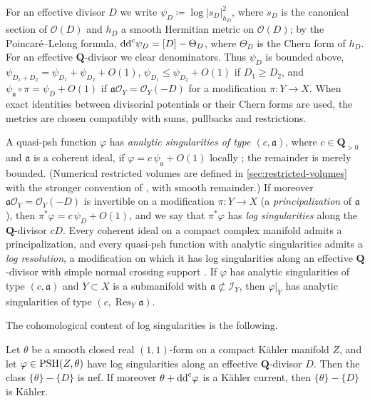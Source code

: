 \documentclass[11pt,a4paper]{amsart}
\newcommand{\rest}[1]{\operatorname{Res}_{#1}}   %
\theoremstyle{definition}
\begin{document}
For an effective divisor $D$ we write
$\psi_D\coloneqq \log|s_D|_{h_D}^2$, where $s_D$ is the canonical section of
$\mathcal O(D)$ and $h_D$ a smooth Hermitian metric on $\mathcal O(D)$;
by the Poincar\'e--Lelong formula, $\mathrm{dd}^{\mathrm{c}}\psi_D=[D]-\Theta_D$, where
$\Theta_D$ is the Chern form of $h_D$. For an effective
$\mathbf Q$-divisor we clear denominators. Thus $\psi_D$ is bounded above,
$\psi_{D_1+D_2}=\psi_{D_1}+\psi_{D_2}+O(1)$,
$\psi_{D_1}\le\psi_{D_2}+O(1)$ if $D_1\ge D_2$, and
$\psi_{\mathfrak a}\circ\pi=\psi_D+O(1)$ if
$\mathfrak a\mathcal O_Y=\mathcal O_Y(-D)$ for a modification
$\pi\colon Y\to X$. When exact identities between divisorial potentials or
their Chern forms are used, the metrics are chosen compatibly with sums,
pullbacks and restrictions.

A quasi-psh function $\varphi$ has \emph{analytic singularities of type
$(c,\mathfrak a)$}, where $c\in\mathbf Q_{>0}$ and $\mathfrak a$ is a
coherent ideal, if $\varphi=c\,\psi_\mathfrak a+O(1)$ locally
\cite[Definition~1.6.1]{XiaSGPT}; the remainder is merely bounded.
(Numerical restricted volumes are defined in
\cref{sec:restricted-volumes} with the stronger convention of
\cite[Section~2]{CT22}, with smooth remainder.) If moreover
$\mathfrak a\mathcal O_Y=\mathcal O_Y(-D)$ is invertible on a modification
$\pi\colon Y\to X$ (a \emph{principalization} of $\mathfrak a$), then
$\pi^*\varphi=c\,\psi_D+O(1)$, and we say that $\pi^*\varphi$ has
\emph{log singularities} along the $\mathbf Q$-divisor $cD$. Every
coherent ideal on a compact complex manifold admits a principalization,
and every quasi-psh function with analytic singularities admits a
\emph{log resolution}, a modification on which it has log singularities
along an effective $\mathbf Q$-divisor with simple normal crossing support
\cite[Theorem~1.6.1]{XiaSGPT}. If $\varphi$ has analytic singularities of
type $(c,\mathfrak a)$ and $Y\subset X$ is a submanifold with
$\mathfrak a\not\subset\mathcal I_Y$, then $\varphi|_Y$ has analytic
singularities of type $(c,\rest{Y}\mathfrak a)$.

The cohomological content of log singularities is the following.

\begin{lemma}\label{lem:residual-nef}
Let $\theta$ be a smooth closed real $(1,1)$-form on a compact K\"ahler
manifold $Z$, and let $\varphi\in\mathrm{PSH}(Z,\theta)$ have log singularities
along an effective $\mathbf Q$-divisor $D$. Then the class $\{\theta\}-\{D\}$ is
nef. If moreover $\theta+\mathrm{dd}^{\mathrm{c}}\varphi$ is a K\"ahler current, then
$\{\theta\}-\{D\}$ is K\"ahler.
\end{lemma}
\end{document}
